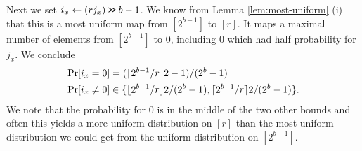 Next we set $i_x\gets (rj_x)\mathbin{\texttt{>\!>}} b-1$. We know from Lemma
\ref{lem:most-uniform} (i) that this is a most uniform map from
$[2^{b-1}]$ to $[r]$.  It maps a maximal number of elements from
$[2^{b-1}]$ to $0$, including $0$ which had half probability for
$j_x$.
We conclude
\begin{align}
   \Pr[i_x=0] &= (\lceil {2^{b-1}/r}\rceil2-1)/(2^{b}-1)
   \label{eq:prix0}
   \\
   \Pr[i_x\neq 0] &\in
   \{\lfloor {2^{b-1}/r} \rfloor2/(2^{b}-1), \lceil {2^{b-1}/r}\rceil2/(2^{b}-1)\}
   \label{eq:prixneq0}
   .
\end{align}
We note
that the probability for $0$ is in the middle of the two other
bounds and often this yields a more uniform distribution on $[r]$ than
the most uniform distribution we could get from the
uniform distribution on $[2^{b-1}]$.

